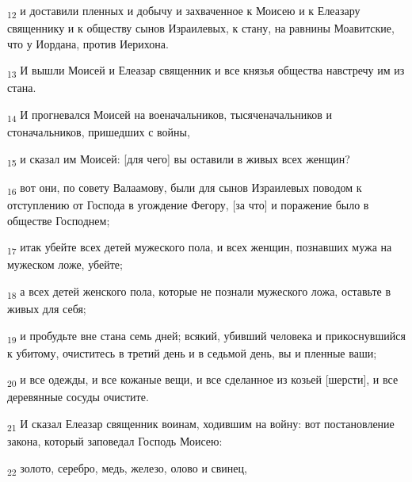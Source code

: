 \begin{tcolorbox}
\textsubscript{12} и доставили пленных и добычу и захваченное к Моисею и к Елеазару священнику и к обществу сынов Израилевых, к стану, на равнины Моавитские, что у Иордана, против Иерихона.
\end{tcolorbox}
\begin{tcolorbox}
\textsubscript{13} И вышли Моисей и Елеазар священник и все князья общества навстречу им из стана.
\end{tcolorbox}
\begin{tcolorbox}
\textsubscript{14} И прогневался Моисей на военачальников, тысяченачальников и стоначальников, пришедших с войны,
\end{tcolorbox}
\begin{tcolorbox}
\textsubscript{15} и сказал им Моисей: [для чего] вы оставили в живых всех женщин?
\end{tcolorbox}
\begin{tcolorbox}
\textsubscript{16} вот они, по совету Валаамову, были для сынов Израилевых поводом к отступлению от Господа в угождение Фегору, [за что] и поражение было в обществе Господнем;
\end{tcolorbox}
\begin{tcolorbox}
\textsubscript{17} итак убейте всех детей мужеского пола, и всех женщин, познавших мужа на мужеском ложе, убейте;
\end{tcolorbox}
\begin{tcolorbox}
\textsubscript{18} а всех детей женского пола, которые не познали мужеского ложа, оставьте в живых для себя;
\end{tcolorbox}
\begin{tcolorbox}
\textsubscript{19} и пробудьте вне стана семь дней; всякий, убивший человека и прикоснувшийся к убитому, очиститесь в третий день и в седьмой день, вы и пленные ваши;
\end{tcolorbox}
\begin{tcolorbox}
\textsubscript{20} и все одежды, и все кожаные вещи, и все сделанное из козьей [шерсти], и все деревянные сосуды очистите.
\end{tcolorbox}
\begin{tcolorbox}
\textsubscript{21} И сказал Елеазар священник воинам, ходившим на войну: вот постановление закона, который заповедал Господь Моисею:
\end{tcolorbox}
\begin{tcolorbox}
\textsubscript{22} золото, серебро, медь, железо, олово и свинец,
\end{tcolorbox}
